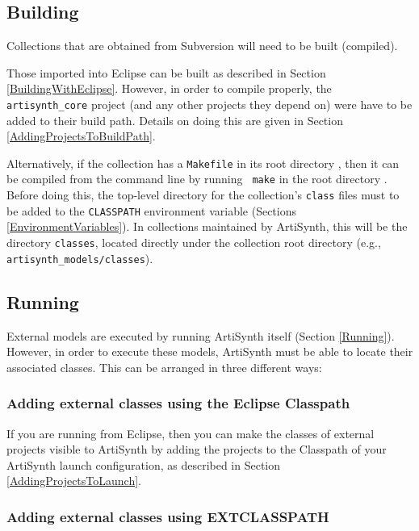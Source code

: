 \documentclass{article}
\def\SEP{/}
\def\directory{directory }
\begin{document}
\subsection{Building}

Collections that are obtained from Subversion will need to be built
(compiled).

Those imported into Eclipse can be built as described in Section
\ref{BuildingWithEclipse}. However, in order to compile properly, the
{\tt artisynth\_core} project (and any other projects they depend on)
were have to be added to their build path. Details on doing this are
given in Section \ref{AddingProjectsToBuildPath}.

Alternatively, if the collection has a {\tt Makefile} in its root
\directory, then it can be compiled from the command line by running {\tt
make} in the root \directory. Before doing this, the top-level
\directory for the collection's {\tt class} files must to be added to
the {\tt CLASSPATH} environment variable (Sections
\ref{EnvironmentVariables}). In collections maintained by ArtiSynth,
this will be the \directory {\tt classes}, located directly under the
collection root \directory (e.g., {\tt artisynth\_models\SEP classes}).



\subsection{Running}

External models are executed by running ArtiSynth itself (Section
\ref{Running}). However, in order to execute these models, ArtiSynth
must be able to locate their associated classes. This can be
arranged in three different ways:

\subsubsection{Adding external classes using the Eclipse Classpath}

If you are running from Eclipse, then you can make the classes of
external projects visible to ArtiSynth by adding the projects to the
{\sf Classpath} of your ArtiSynth launch configuration, as described
in Section \ref{AddingProjectsToLaunch}.

\subsubsection{Adding external classes using EXTCLASSPATH}
\end{document}
